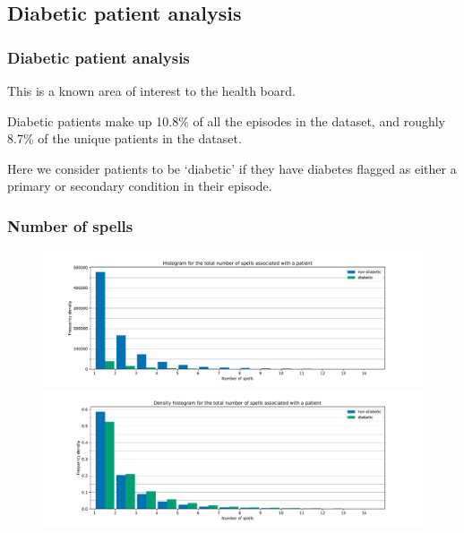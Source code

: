 \documentclass{beamer}
\begin{document}
\subsection{Diabetic patient analysis}

\begin{frame}
    \frametitle{Diabetic patient analysis}

    This is a known area of interest to the health board.

    \vspace{10pt}
    Diabetic patients make up 10.8\% of all the episodes in the dataset, and
    roughly 8.7\% of the unique patients in the dataset.

    \vspace{10pt}
    Here we consider patients to be `diabetic' if they have diabetes flagged as
    either a primary or secondary condition in their episode.
\end{frame}

\begin{frame}
    \frametitle{Number of spells}

    \begin{figure}
        \begin{minipage}{\linewidth}
            \includegraphics[width=\linewidth]
                {./img/diabetic_no_spells_freq_hist.pdf}
        \end{minipage}
        \begin{minipage}{\linewidth}
            \includegraphics[width=\linewidth]
                {./img/diabetic_no_spells_density_hist.pdf}
        \end{minipage}
    \end{figure}
\end{frame}
\end{document}
